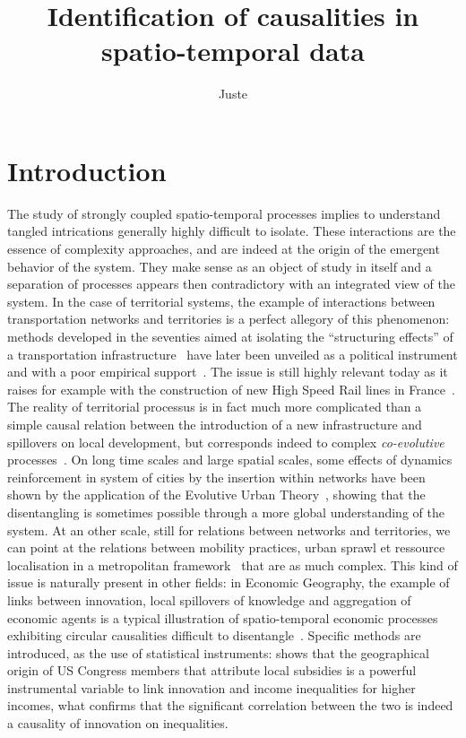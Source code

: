 \documentclass[english]{./sageo}
\title[Spatio-temporal Causalities]{Identification of causalities in spatio-temporal data}
\author[1,2]{Juste}{Raimbault}
\begin{document}
\maketitle




\section{Introduction}


The study of strongly coupled spatio-temporal processes implies to understand tangled intrications generally highly difficult to isolate. These interactions are the essence of complexity approaches, and are indeed at the origin of the emergent behavior of the system. They make sense as an object of study in itself and a separation of processes appears then contradictory with an integrated view of the system. In the case of territorial systems, the example of interactions between transportation networks and territories is a perfect allegory of this phenomenon: methods developed in the seventies aimed at isolating the ``structuring effects'' of a transportation infrastructure~\cite{bonnafous1974methodologies} have later been unveiled as a political instrument and with a poor empirical support~\cite{offner1993effets}. The issue is still highly relevant today as it raises for example with the construction of new High Speed Rail lines in France~\cite{crozethalshs01094554}. The reality of territorial processus is in fact much more complicated than a simple causal relation between the introduction of a new infrastructure and spillovers on local development, but corresponds indeed to complex \emph{co-evolutive} processes~\cite{bretagnolletel00459720}. On long time scales and large spatial scales, some effects of dynamics reinforcement in system of cities by the insertion within networks have been shown by the application of the Evolutive Urban Theory~\cite{espacegeo2014effets}, showing that the disentangling is sometimes possible through a more global understanding of the system. At an other scale, still for relations between networks and territories, we can point at the relations between mobility practices, urban sprawl et ressource localisation in a metropolitan framework~\cite{cerqueira2017inegalites} that are as much complex. This kind of issue is naturally present in other fields: in Economic Geography, the example of links between innovation, local spillovers of knowledge and aggregation of economic agents is a typical illustration of spatio-temporal economic processes exhibiting circular causalities difficult to disentangle~\cite{audretsch1996r}. Specific methods are introduced, as the use of statistical instruments: \cite{aghion2015innovation} shows that the geographical origin of US Congress members that attribute local subsidies is a powerful instrumental variable to link innovation and income inequalities for higher incomes, what confirms that the significant correlation between the two is indeed a causality of innovation on inequalities.
\end{document}
